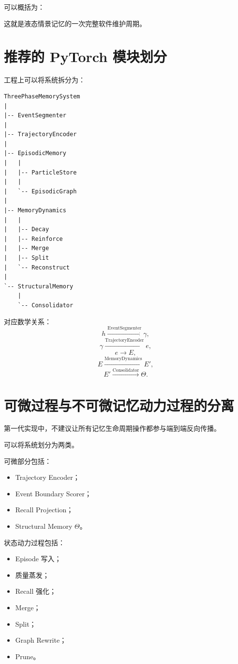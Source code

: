 可以概括为：
\begin{statementbox}
\centering
{}
\end{statementbox}

这就是液态情景记忆的一次完整软件维护周期。

\section{推荐的 PyTorch 模块划分}

工程上可以将系统拆分为：

\begin{verbatim}
ThreePhaseMemorySystem
|
|-- EventSegmenter
|
|-- TrajectoryEncoder
|
|-- EpisodicMemory
|   |
|   |-- ParticleStore
|   |
|   `-- EpisodicGraph
|
|-- MemoryDynamics
|   |
|   |-- Decay
|   |-- Reinforce
|   |-- Merge
|   |-- Split
|   `-- Reconstruct
|
`-- StructuralMemory
    |
    `-- Consolidator
\end{verbatim}

对应数学关系：
\[
h
\xrightarrow{
\mathrm{EventSegmenter}
}
\gamma,
\]
\[
\gamma
\xrightarrow{
\mathrm{TrajectoryEncoder}
}
e,
\]
\[
e
\rightarrow
E,
\]
\[
E
\xrightarrow{
\mathrm{MemoryDynamics}
}
E',
\]
\[
E'
\xrightarrow{
\mathrm{Consolidator}
}
\Theta.
\]

\section{可微过程与不可微记忆动力过程的分离}

第一代实现中，不建议让所有记忆生命周期操作都参与端到端反向传播。

可以将系统划分为两类。

可微部分包括：

\begin{itemize}
    \item Trajectory Encoder；
    \item Event Boundary Scorer；
    \item Recall Projection；
    \item Structural Memory $\Theta$。
\end{itemize}

状态动力过程包括：

\begin{itemize}
    \item Episode 写入；
    \item 质量蒸发；
    \item Recall 强化；
    \item Merge；
    \item Split；
    \item Graph Rewrite；
    \item Prune。
\end{itemize}

